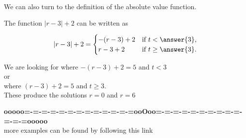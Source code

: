 \documentclass{ximera}
\begin{document}
\begin{example}
\begin{image}
\end{image}



We can also turn to the definition of the absolute value function.


The function $|r-3| + 2$ can be written as 



\[
|r-3| + 2 = 
\begin{cases}
  -(r-3) + 2  & \text{if $t<\answer{3}$,}\\
   r-3 + 2  & \text{if $t\ge \answer{3}$}.
\end{cases}
\]


We are looking for where $-(r-3) + 2 = 5$ and $ t < 3$  \\

or \\

where $(r-3) + 2 = 5$ and $t \ge 3$.  \\


These produce the solutions $r=0$ and $r=6$










\end{example}



















\begin{center}
\textbf{\textcolor{green!50!black}{ooooo=-=-=-=-=-=-=-=-=-=-=-=-=ooOoo=-=-=-=-=-=-=-=-=-=-=-=-=ooooo}} \\

more examples can be found by following this link\\ 

\end{center}
\end{document}
